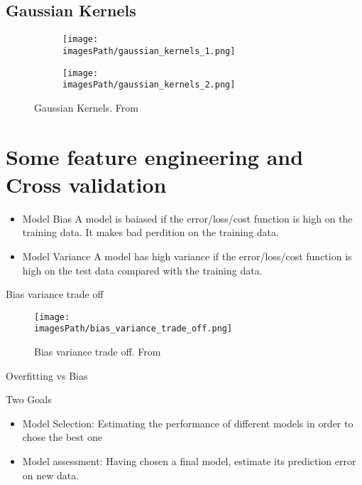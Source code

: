 \subsection{Gaussian Kernels}
\begin{figure}
     \centering
     \begin{subfigure}[b]{0.4\textwidth}
         \centering
         \texttt{[image: \\imagesPath/gaussian\_kernels\_1.png]}
     \end{subfigure}
     \hfill
     \begin{subfigure}[b]{0.4\textwidth}
         \centering
         \texttt{[image: \\imagesPath/gaussian\_kernels\_2.png]}
     \end{subfigure}
        \caption{Gaussian Kernels. From \cite{}}
\end{figure}


\section{Some feature engineering and Cross validation}
\begin{itemize}
    \item Model Bias \newline
    A model is baiased if the error/loss/cost function is high on the training data. It makes bad perdition on the training data.
    \item Model Variance \newline
    A model has high variance if the error/loss/cost function is high on the test data compared with the training data. 
\end{itemize}

Bias variance trade off
\begin{figure}[!h]
    \centering
    \texttt{[image: \\imagesPath/bias\_variance\_trade\_off.png]}
    \caption{Bias variance trade off. From \cite{}}
\end{figure}

Overfitting vs Bias 

Two Goals
\begin{itemize}
    \item Model Selection: \newline 
    Estimating the performance of different models in order to chose the best one 
    \item Model assessment: \newline 
    Having chosen a final model, estimate its prediction error on new data. 
\end{itemize}

